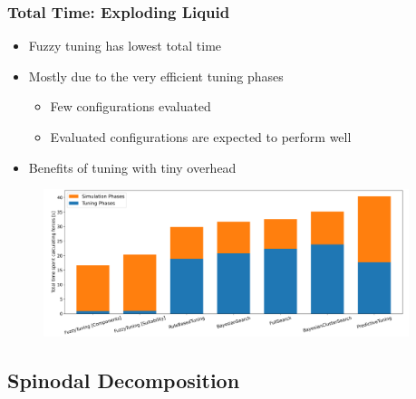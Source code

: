 \documentclass[
	10pt,
	t		%
]{beamer}
\begin{document}
\begin{frame}
	\frametitle{Total Time: Exploding Liquid}
	\begin{itemize}
		\item Fuzzy tuning has lowest total time
		\item Mostly due to the very efficient tuning phases
		      \begin{itemize}
			      \item Few configurations evaluated
			      \item Evaluated configurations are expected to perform well
		      \end{itemize}
		\item Benefits of tuning with tiny overhead
	\end{itemize}

	\begin{figure}
		\centering
		\includegraphics[width=0.95\textwidth]{figures/exploding-liquid-total.png}
	\end{figure}
\end{frame}

\subsection{Spinodal Decomposition}
\end{document}
